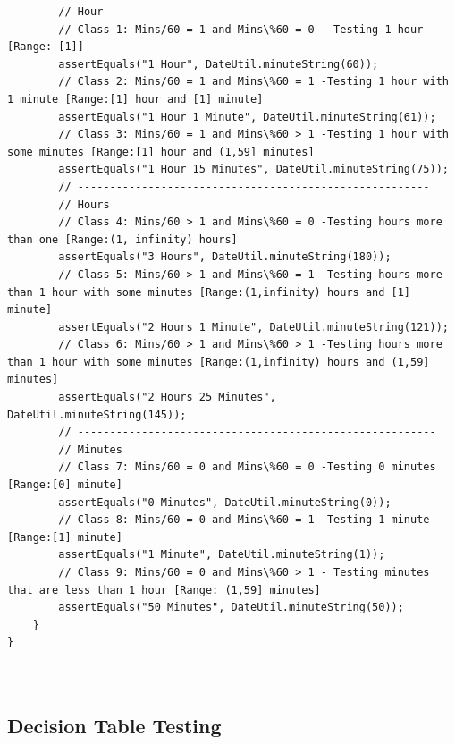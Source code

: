 \documentclass[fontsize=12pt,paper=letter,twoside]{scrartcl}
\begin{document}
\begin{itemize}
\begin{lstlisting}
		// Hour
		// Class 1: Mins/60 = 1 and Mins\%60 = 0 - Testing 1 hour [Range: [1]]
		assertEquals("1 Hour", DateUtil.minuteString(60));
		// Class 2: Mins/60 = 1 and Mins\%60 = 1 -Testing 1 hour with 1 minute [Range:[1] hour and [1] minute]
		assertEquals("1 Hour 1 Minute", DateUtil.minuteString(61));
		// Class 3: Mins/60 = 1 and Mins\%60 > 1 -Testing 1 hour with some minutes [Range:[1] hour and (1,59] minutes]
		assertEquals("1 Hour 15 Minutes", DateUtil.minuteString(75));
		// -------------------------------------------------------
		// Hours
		// Class 4: Mins/60 > 1 and Mins\%60 = 0 -Testing hours more than one [Range:(1, infinity) hours]
		assertEquals("3 Hours", DateUtil.minuteString(180));
		// Class 5: Mins/60 > 1 and Mins\%60 = 1 -Testing hours more than 1 hour with some minutes [Range:(1,infinity) hours and [1] minute]
		assertEquals("2 Hours 1 Minute", DateUtil.minuteString(121));
		// Class 6: Mins/60 > 1 and Mins\%60 > 1 -Testing hours more than 1 hour with some minutes [Range:(1,infinity) hours and (1,59] minutes]
		assertEquals("2 Hours 25 Minutes", DateUtil.minuteString(145));
		// --------------------------------------------------------
		// Minutes
		// Class 7: Mins/60 = 0 and Mins\%60 = 0 -Testing 0 minutes [Range:[0] minute]
		assertEquals("0 Minutes", DateUtil.minuteString(0));
		// Class 8: Mins/60 = 0 and Mins\%60 = 1 -Testing 1 minute [Range:[1] minute]
		assertEquals("1 Minute", DateUtil.minuteString(1));
		// Class 9: Mins/60 = 0 and Mins\%60 > 1 - Testing minutes that are less than 1 hour [Range: (1,59] minutes]
		assertEquals("50 Minutes", DateUtil.minuteString(50));
	}
}



\end{lstlisting}

\end{itemize}

\newpage
\subsection{Decision Table Testing}
\end{document}

